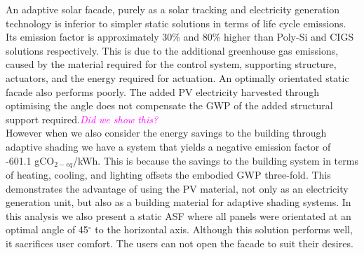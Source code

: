 
An adaptive solar facade, purely as a solar tracking and electricity generation technology is inferior to simpler static solutions in terms of life cycle emissions. Its emission factor is approximately 30\% and 80\% higher than Poly-Si and CIGS solutions respectively. This is due to the additional greenhouse gas emissions, caused by the material required for the control system, supporting structure, actuators, and the energy required for actuation. An optimally orientated static facade also performs poorly. The added PV electricity harvested through optimising the angle does not compensate the GWP of the added structural support required.\textcolor{magenta}{\textit{Did we show this?}}\\

However when we also consider the energy savings to the building through adaptive shading we have a system that yields a negative emission factor of -601.1 gCO$_{2-eq}$/kWh. This is because the savings to the building system in terms of heating, cooling, and lighting offsets the embodied GWP three-fold. This demonstrates the advantage of using the PV material, not only as an electricity generation unit, but also as a building material for adaptive shading systems. In this analysis we also present a static ASF where all panels were orientated at an optimal angle of 45$^{\circ}$ to the horizontal axis. Although this solution performs well, it sacrifices user comfort. The users can not open the facade to suit their desires.\\


